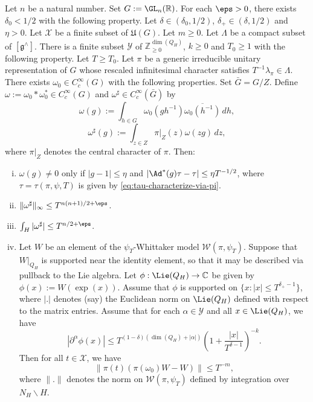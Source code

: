 \begin{theorem}
  Let $n$ be a natural number.  Set $G := \GL_n(\mathbb{R})$.  For each $\eps > 0$, there exists $\delta_0 < 1/2$ with the following property.  Let $\delta \in (\delta_0, 1/2)$, $\delta_+ \in (\delta, 1/2)$ and $\eta > 0$.  Let $\mathcal{X}$ be a finite subset of $\mathfrak{U}(G)$.  Let $m \geq 0$.  Let $\Lambda$ be a compact subset of $[\mathfrak{g}^\wedge]$.  There is a finite subset $\mathcal{Y}$ of $\mathbb{Z}_{\geq 0}^{\dim(Q_H)}$, $k \geq 0$ and $T_0 \geq 1$ with the following property.  Let $T \geq T_0$.  Let $\pi$ be a generic irreducible unitary representation of $G$ whose rescaled infinitesimal character satisfies $T^{-1} \lambda_\pi \in \Lambda$.  There exists $\omega_0 \in C_c^\infty(G)$ with the following properties.  Set $\bar{G} = G/Z$.  Define $\omega := \omega_0 \ast \omega_0^\ast \in C_c^\infty(G)$ and $\omega^\sharp \in C_c^\infty(\bar{G})$ by
  \begin{equation*}
    \omega(g) := \int_{h \in G} \omega_0(g h^{-1}) \overline{\omega_0(h^{-1})} \, d h,
  \end{equation*}
  \begin{equation*}
    \omega^\sharp (g) := \int_{z \in Z}
    \pi|_Z (z) \omega(z g) \, d z,
  \end{equation*}
  where $\pi|_Z$ denotes the central character of $\pi$.  Then:
  \begin{enumerate}[(i)]
  \item $\omega(g) \neq 0$ only if $|g -1| \leq \eta$ and $|\Ad^*(g) \tau - \tau| \leq \eta T^{-1/2}$, where $\tau = \tau(\pi,\psi,T)$ is given by \eqref{eq:tau-characterize-via-pi}.
  \item $\|\omega^\sharp\|_{\infty} \leq T^{n(n+1)/2+\eps}$.
  \item $\int_H |\omega^\sharp| \leq T^{n/2 + \eps}$.
  \item Let $W$ be an element of the $\psi_T$-Whittaker model $\mathcal{W}(\pi,\psi_T)$.  Suppose that $W|_{Q_H}$ is supported near the identity element, so that it may be described via pullback to the Lie algebra.  Let $\phi : \Lie(Q_H) \rightarrow \mathbb{C}$ be given by $\phi(x) := W(\exp(x))$.  Assume that $\phi$ is supported on $\{x : |x| \leq T^{\delta_+ - 1}\}$, where $|.|$ denotes (say) the Euclidean norm on $\Lie(Q_H)$ defined with respect to the matrix entries.  Assume that for each $\alpha \in \mathcal{Y}$ and all $x \in \Lie(Q_H)$, we have
    \begin{equation*}
      \left\lvert \partial^\alpha \phi(x) \right\rvert \leq T^{(1 - \delta) (\dim(Q_H) + |\alpha|)} \left( 1 + \frac{|x|}{T^{\delta-1}} \right)^{-k}.
    \end{equation*}
    Then for all $t\in \mathcal{X}$, we have
    \begin{equation*}
      \|\pi(t) (\pi(\omega_0)W - W)\| \leq T^{-m},
    \end{equation*}
    where $\|.\|$ denotes the norm on $\mathcal{W}(\pi,\psi_T)$ defined by integration over $N_H \backslash H$.
  \end{enumerate}
\end{theorem}

\printindex

{} 

